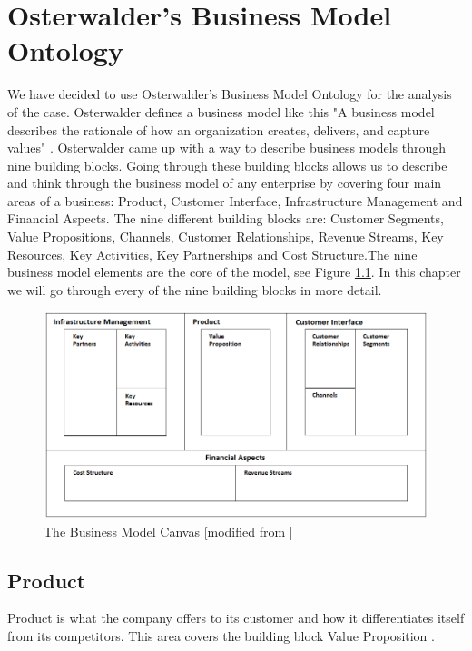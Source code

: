 \chapter{Osterwalder's Business Model Ontology}
We have decided to use Osterwalder's Business Model Ontology for the analysis of the case. Osterwalder defines a business model like this "A business model describes the rationale of how an organization creates, delivers, and capture values" \cite{osterwalder}. Osterwalder came up with a way to describe business models through nine building blocks. Going through these building blocks allows us to describe and think through the business model of any enterprise by covering four main areas of a business:  Product, Customer Interface, Infrastructure Management and Financial Aspects. The nine different building blocks are: Customer Segments, Value Propositions, Channels, Customer Relationships, Revenue Streams, Key Resources, Key Activities, Key Partnerships and Cost Structure.The nine business model elements are the core of the model, see Figure \ref{fig:TheBusinessModelCanvas}. In this chapter we will go through every of the nine building blocks in more detail. \cite{osterwalder}


\begin{figure}[h]
\caption[The Business Model Canvas]{The Business Model Canvas [modified from \cite{osterwalder}]}
\label{fig:TheBusinessModelCanvas}
\begin{center}
\includegraphics[scale=0.6]{osterwaldersbmmodified}
\end{center}
\end{figure}
\newpage
\section{Product}
Product is what the company offers to its customer and how it differentiates itself from its competitors. This area covers the building block Value Proposition \cite{osterwalderthesis}.

